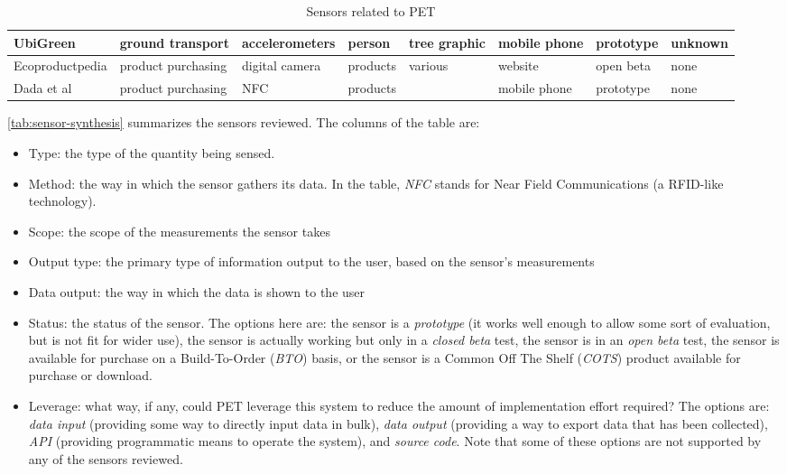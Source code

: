 \begin{table}[htbp]
\begin{center}
\begin{minipage}{\textwidth}
\begin{tabular}{| p{2.2cm} || p{1.5cm} | p{2cm} | l | p{1.5cm} | p{1.6cm} | p{1.5cm} | p{1.5cm} |}
			UbiGreen & ground transport & accelerometers & person & tree graphic & mobile phone & prototype & unknown \\ \hline
			
			Ecoproductpedia & product purchasing & digital camera & products & various & website & open beta & none \\ \hline
			
			Dada et al & product purchasing & NFC & products & \COtwo & mobile phone & prototype & none \\ \hline
			
		\end{tabular}
		\end{minipage}
	\caption{Sensors related to PET}
	\label{tab:sensor-synthesis}
	\end{center}
\end{table}

\autoref{tab:sensor-synthesis} summarizes the sensors reviewed. The columns of the table are:

\begin{itemize}
	\item Type: the type of the quantity being sensed.
	\item Method: the way in which the sensor gathers its data. In the table, \emph{NFC} stands for Near Field Communications (a RFID-like technology).
	\item Scope: the scope of the measurements the sensor takes
	\item Output type: the primary type of information output to the user, based on the sensor's measurements
	\item Data output: the way in which the data is shown to the user
	\item Status: the status of the sensor. The options here are: the sensor is a \emph{prototype} (it works well enough to allow some sort of evaluation, but is not fit for wider use), the sensor is actually working but only in a \emph{closed beta} test, the sensor is in an \emph{open beta} test, the sensor is available for purchase on a Build-To-Order (\emph{BTO}) basis, or the sensor is a Common Off The Shelf (\emph{COTS}) product available for purchase or download.
	\item Leverage: what way, if any, could PET leverage this system to reduce the amount of implementation effort required? The options are: \emph{data input} (providing some way to directly input data in bulk), \emph{data output} (providing a way to export data that has been collected), \emph{API} (providing programmatic means to operate the system), and \emph{source code}. Note that some of these options are not supported by any of the sensors reviewed.
\end{itemize}

